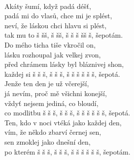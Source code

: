 
\\

Akáty šumí, když padá déšť,\\
padá mi do vlasů, chce mi je splést,\\
neví, že láskou chci hlavu si plést,\\
tak mu to š š\hspace{0.8cm}š, š š\hspace{0.8cm}š,
š š š šš š, šepotám.\\

Do mého ticha tiše vkročil on,\\
lásku rozhoupal jak velkej zvon,\\
před chrámem lásky byl bláznivej shon,\\
každej si š š š, š š š, š š š š š š, šepotá.\\

Jenže ten den je už včerejší,\\
já nevím, proč mě všichni konejší,\\
vždyť nejsem jediná, co bloudí,\\
co modlitbu š š š, š š š, š š š š š š, šepotá.\\

Ten, kdo v noci vtéká jako každej den,\\
vím, že někdo zbarví černej sen,\\
sen zmoklej jako dnešní den,\\
po kterém š š š, š š š, š š š š š š, šepotám.\\

\newpage
